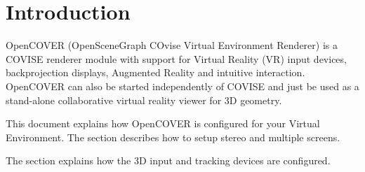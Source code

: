 \begin{htmlonly}

\end{htmlonly}



\startdocument

\chapter{Introduction}

OpenCOVER (OpenSceneGraph COvise Virtual Environment Renderer) is a COVISE renderer module
with support for Virtual Reality (VR) input devices, backprojection displays,
Augmented Reality and intuitive interaction. 
OpenCOVER can also be started independently of COVISE and just be used as a stand-alone collaborative virtual
reality viewer for 3D geometry.

This document explains how OpenCOVER is configured for your Virtual Environment. 
The section
 describes how to setup stereo and multiple screens.

The section
explains how the 3D input and tracking devices are configured.


